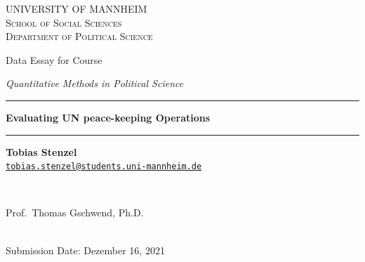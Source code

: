 \documentclass[12pt,english,a4paper,oneside]{article}
\begin{document}
\begin{titlepage}

    \begin{center}
    \large{ \textsc{ \uppercase{University of Mannheim} \\ \vspace{-0.2cm}
School of Social Sciences \\ \vspace{-0.2cm}
Department of Political Science}}

      
        \vspace{3.5cm}
        

       \large{   Data Essay for Course   }


       \large{ \textit{   Quantitative Methods in Political Science   }}

\renewcommand{\linethickness}{0.03em}
\rule{\linewidth}{\linethickness}


       \LARGE{ \textbf{   Evaluating UN peace-keeping Operations   }}


       \large{  }

        \vspace{-0.2cm}
\rule{\linewidth}{\linethickness}


\begin{minipage}[t]{0.5\textwidth}
\begin{flushleft}
\singlespacing
 \textbf{Tobias Stenzel}  \\ 


 \href{mailto:tobias.stenzel@students.uni-mannheim.de}{\nolinkurl{tobias.stenzel@students.uni-mannheim.de}}  \\ 

\end{flushleft}
\end{minipage}
\begin{minipage}[t]{0.4\textwidth}
\hfill
\end{minipage}\\
\vspace{0.2cm}
\begin{minipage}[t]{0.35\textwidth}
\hfill
\end{minipage}
\begin{minipage}[t]{0.55\textwidth}
\begin{flushright}
\singlespacing
     Prof.~Thomas Gschwend, Ph.D.  \\       

\end{flushright}
\end{minipage}\\
%


         \vfill
         Submission Date: Dezember 16, 2021 \\ 
        





         \vfill



     \end{center}
    \thispagestyle{empty}
\end{titlepage}
\end{document}
